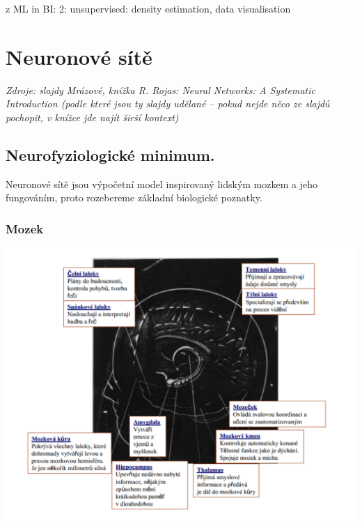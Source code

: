 \documentclass[11pt]{report} %
\numberwithin{equation}{section}
\begin{document}
z ML in BI:
2: unsupervised: density estimation, data visualisation



\chapter{Neuronové sítě}
\textit{Zdroje: slajdy Mrázové, knížka R. Rojas: Neural Networks: A Systematic Introduction (podle které jsou ty slajdy udělané -- pokud nejde něco ze slajdů pochopit, v knížce jde najít širší kontext)}

\section{Neurofyziologické minimum.}
Neuronové sítě jsou výpočetní model inspirovaný lidským mozkem a jeho fungováním, proto rozebereme základní biologické poznatky.

\subsection{Mozek}

\includegraphics[width=\textwidth]{img/mozek.png}
\end{document}
